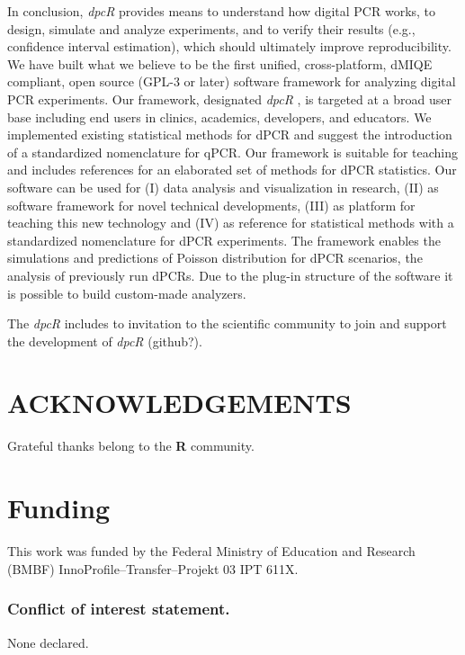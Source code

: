 \documentclass[a4,center,fleqn]{NAR}
\begin{document}
In conclusion, \textit{dpcR} provides means to understand how digital PCR works, 
to design, simulate and analyze experiments, and to verify their results (e.g., 
confidence interval estimation), which should ultimately improve 
reproducibility. We have built what we believe to be the first unified, 
cross-platform, dMIQE compliant, open source (GPL-3 or later) software framework for 
analyzing digital PCR experiments. Our framework, designated \textit{dpcR} , is 
targeted at a broad user base including end users in clinics, academics, 
developers, and educators. We implemented existing statistical methods for dPCR 
and suggest the introduction of a standardized nomenclature for qPCR. Our 
framework is suitable for teaching and includes references for an elaborated 
set of methods for dPCR statistics. Our software can be used for (I) data 
analysis and visualization in research, (II) as software framework for novel 
technical developments, (III) as platform for teaching this new technology and 
(IV) as reference for statistical methods with a standardized nomenclature for 
dPCR experiments. The framework enables the simulations and predictions of Poisson 
distribution for dPCR scenarios, the analysis of previously run dPCRs. Due to 
the plug-in structure of the software it is possible to build custom-made 
analyzers.

The \textit{dpcR} includes 
to invitation to the scientific community to join and support the development of 
\textit{dpcR} (github?).


\section{ACKNOWLEDGEMENTS}

Grateful thanks belong to the \textbf{R} community.

\section{Funding}
This work was funded by the Federal Ministry of Education and Research (BMBF) InnoProfile--Transfer--Projekt 03 IPT 611X.
 
\subsubsection{Conflict of interest statement.} None declared.
\newpage




\end{document}
